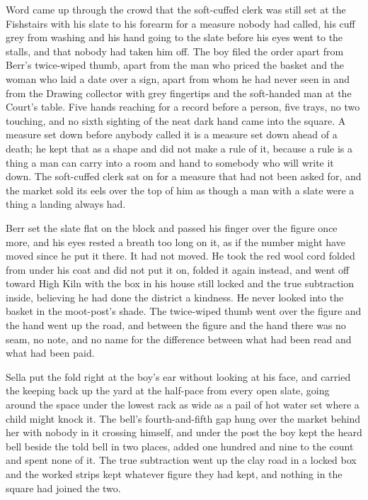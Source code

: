 Word came up through the crowd that the soft-cuffed clerk was still set at the Fishstairs with his slate to his forearm for a measure nobody had called, his cuff grey from washing and his hand going to the slate before his eyes went to the stalls, and that nobody had taken him off. The boy filed the order apart from Berr's twice-wiped thumb, apart from the man who priced the basket and the woman who laid a date over a sign, apart from  whom he had never seen in  and from the Drawing collector with grey fingertips and the soft-handed man at the Court's table. Five hands reaching for a record before a person, five trays, no two touching, and no sixth sighting of the neat dark hand came into the square. A measure set down before anybody called it is a measure set down ahead of a death; he kept that as a shape and did not make a rule of it, because a rule is a thing a man can carry into a room and hand to somebody who will write it down. The soft-cuffed clerk sat on for a measure that had not been asked for, and the market sold its eels over the top of him as though a man with a slate were a thing a landing always had.

Berr set the slate flat on the block and passed his finger over the figure once more, and his eyes rested a breath too long on it, as if the number might have moved since he put it there. It had not moved. He took the red wool cord folded from under his coat and did not put it on, folded it again instead, and went off toward High Kiln with the box in his house still locked and the true subtraction inside, believing he had done the district a kindness. He never looked into the basket in the moot-post's shade. The twice-wiped thumb went over the figure and the hand went up the road, and between the figure and the hand there was no seam, no note, and no name for the difference between what had been read and what had been paid.

Sella put the fold right at the boy's ear without looking at his face, and carried the keeping back up the yard at the half-pace from every open slate, going around the space under the lowest rack as wide as a pail of hot water set where a child might knock it. The bell's fourth-and-fifth gap hung over the market behind her with nobody in it crossing himself, and under the post the boy kept the heard bell beside the told bell in two places, added one hundred and nine to the count and spent none of it. The true subtraction went up the clay road in a locked box and the worked strips kept whatever figure they had kept, and nothing in the square had joined the two.
